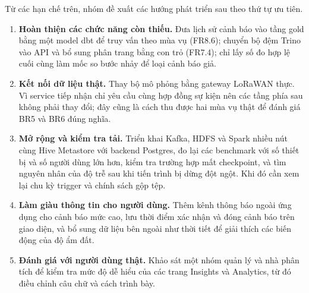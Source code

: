 Từ các hạn chế trên, nhóm đề xuất các hướng phát triển sau theo thứ tự ưu tiên.

\begin{enumerate}
  \item \textbf{Hoàn thiện các chức năng còn thiếu.} Đưa lịch sử cảnh báo vào tầng gold bằng một model dbt để truy vấn theo mùa vụ (FR8.6); chuyển bộ đệm Trino vào API và bổ sung phân trang bằng con trỏ (FR7.4); chỉ lấy số đo hợp lệ cuối cùng làm mốc so bước nhảy để loại cảnh báo giả.
  \item \textbf{Kết nối dữ liệu thật.} Thay bộ mô phỏng bằng gateway LoRaWAN thực. Vì service tiếp nhận chỉ yêu cầu cùng hợp đồng sự kiện nên các tầng phía sau không phải thay đổi; đây cũng là cách thu được hai mùa vụ thật để đánh giá BR5 và BR6 đúng nghĩa.
  \item \textbf{Mở rộng và kiểm tra tải.} Triển khai Kafka, HDFS và Spark nhiều nút cùng Hive Metastore với backend Postgres, đo lại các benchmark với số thiết bị và số người dùng lớn hơn, kiểm tra trường hợp mất checkpoint, và tìm nguyên nhân của độ trễ sau khi tiến trình bị dừng đột ngột. Khi đó cần xem lại chu kỳ trigger và chính sách gộp tệp.
  \item \textbf{Làm giàu thông tin cho người dùng.} Thêm kênh thông báo ngoài ứng dụng cho cảnh báo mức cao, lưu thời điểm xác nhận và đóng cảnh báo trên giao diện, và bổ sung dữ liệu bên ngoài như thời tiết để giải thích các biến động của độ ẩm đất.
  \item \textbf{Đánh giá với người dùng thật.} Khảo sát một nhóm quản lý và nhà phân tích để kiểm tra mức độ dễ hiểu của các trang Insights và Analytics, từ đó điều chỉnh câu chữ và cách trình bày.
\end{enumerate}
